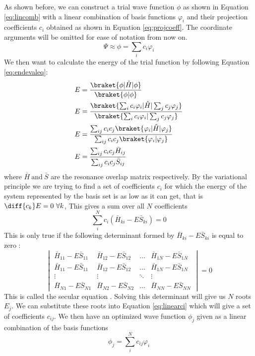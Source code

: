 \documentclass[../master_thesis.tex]{subfiles}
\begin{document}
As shown before, we can construct a trial wave function $\phi$ as shown in Equation
\ref{eq:lincomb} with a linear combination of basis functions $\varphi_i$ and
their projection coefficients $c_i$ obtained as shown in Equation \ref{eq:projcoeff}.
The coordinate arguments will be omitted for ease of notation from now on.
\begin{equation}
  \Psi \approx \phi = \sum_i c_i \varphi_i
\end{equation}
We then want to calculate the energy of the trial function by following Equation
 \ref{eq:endevaleq}\cite{Cramer:2004}:
 \begin{align}
   \begin{split}
     E &= \frac{\braket{\phi|\hat{H}|\phi}}{\braket{\phi|\phi}} \\
     E &= \frac{\braket{\sum_i c_i \varphi_i|\hat{H}|\sum_j c_j \varphi_j}}{\braket{\sum_i c_i \varphi_i|\sum_j c_j \varphi_j}} \\
     E &= \frac{\sum_{ij} c_i c_j \braket{\varphi_i|\hat{H}|\varphi_j}}{\sum_{ij}c_i c_j\braket{\varphi_i|\varphi_j}}\\
     E &= \frac{\sum_{ij} c_i c_j\bar{H}_{ij}}{\sum_{ij} c_i c_j\bar{S}_{ij}}
   \end{split}
 \end{align}
where $\bar{H}\ \text{and} \ \bar{S}$ are the resonance overlap matrix respectively.
By the variational principle we are trying to find a set of coefficients $c_i$
for which the energy of the system represented by the basis set is as low as it
can get, that is $\diff{c_k}E = 0 \ \forall k $, This gives a sum over all $N$
coefficients \cite{Cramer:2004}
\begin{equation}\label{eq:linearci}
  \sum_{i}^N c_i (\bar{H}_{ki} - E\bar{S}_{ki}) = 0
\end{equation}
This is only true if the following determinant formed by $\bar{H}_{ki} - E\bar{S}_{ki}$
is equal to zero \cite{Cramer:2004}:
\begin{equation}\label{eq:seceq}
  \begin{vmatrix}
    \bar{H}_{11} - E\bar{S}_{11} & \bar{H}_{12} - E\bar{S}_{12} & \ldots & \bar{H}_{1N} - E\bar{S}_{1N} \\
    \bar{H}_{11} - E\bar{S}_{11} & \bar{H}_{12} - E\bar{S}_{12} & \ldots & \bar{H}_{1N} - E\bar{S}_{1N} \\
    \vdots & \vdots & \ddots & \vdots\\
    \bar{H}_{N1} - E\bar{S}_{N1} & \bar{H}_{N2} - E\bar{S}_{N2} & \ldots & \bar{H}_{NN} - E\bar{S}_{NN}
  \end{vmatrix} = 0
\end{equation}
This is called the secular equation \cite{Cramer:2004}. Solving this determinant
will give us $N$ roots $E_j$. We can substitute these roots into Equation
\ref{eq:linearci} which will give a set of coefficients $c_{ij}$. We then have an
optimized wave function $\phi_j$ given as a linear combination of the basis functions
\begin{equation}
  \phi_j = \sum_{i}^N c_{ij}\varphi_i
\end{equation}
\end{document}
